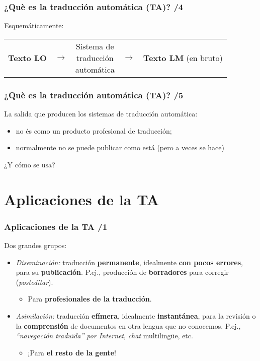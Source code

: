 \documentclass{beamer}
\newcommand{\empha}[1]{\emph{#1}\/}
\begin{document}

\begin{frame}
\frametitle{¿Què es la traducción automática (TA)? /4}

Esquemáticamente:

\begin{center}
\begin{tabular}{ccccc}
\textbf{Texto LO} & $\to$ & \framebox{\parbox{2.2cm}{Sistema de \\ traducción
    \\ automática}} & $\to$ & \parbox{2.0cm}{\textbf{Texto LM} (en bruto)} \\ 
\end{tabular}
\end{center}


\end{frame}


\begin{frame}
\frametitle{¿Què es la traducción automática (TA)? /5}

La salida que producen los sistemas de traducción automática:
\begin{itemize}
\item no és como un producto profesional de traducción;
\item normalmente no se puede publicar como está (pero a veces se hace)
\end{itemize}
¿Y cómo se usa?

\end{frame}


\section{Aplicaciones de la TA}
\begin{frame}
\frametitle{Aplicaciones de la TA /1}


Dos grandes grupos:
\begin{itemize} 

\item\empha{Diseminación:} traducción \textbf{permanente}, idealmente
  \textbf{con pocos errores}, para su  \textbf{publicación}. P.ej.,
  producción de \textbf{borradores} para corregir
  (\textit{posteditar}).
\begin{itemize}
\item Para \textbf{profesionales de la traducción}.
\end{itemize}

\item\empha{Asimilación:} traducción \textbf{efímera}, idealmente
  \textbf{instantánea}, para la revisión o la \textbf{comprensión} de
  documentos en otra lengua que no conocemos. P.ej.,
  \empha{``navegación traduïda'' por Internet}, \textit{chat}
  multilingüe, etc.
  \begin{itemize}
  \item ¡Para \textbf{el resto de la gente}!

  \end{itemize}

\end{itemize}

\end{frame}
\end{document}
